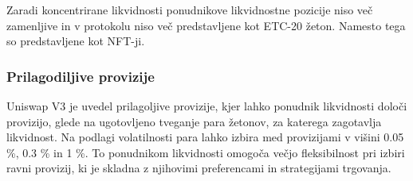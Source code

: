 \documentclass[a4paper,12pt]{article}%
\begin{document}





Zaradi koncentrirane likvidnosti ponudnikove likvidnostne pozicije niso več zamenljive in v protokolu niso več predstavljene kot ETC-20 žeton. Namesto tega so predstavljene kot NFT-ji. 


\subsubsection{Prilagodiljive provizije}
Uniswap V3 je uvedel prilagoljive provizije, kjer lahko ponudnik likvidnosti določi provizijo, glede na ugotovljeno tveganje para žetonov, za katerega zagotavlja likvidnost. Na podlagi volatilnosti para lahko izbira med provizijami v višini 0.05 \%, 0.3 \% in 1 \%. 
To ponudnikom likvidnosti omogoča večjo fleksibilnost pri izbiri ravni provizij, ki je skladna z njihovimi preferencami in strategijami trgovanja.
\end{document}

